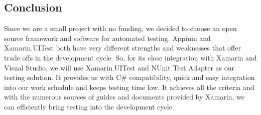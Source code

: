\documentclass[onecolumn, draftclsnofoot,10pt, compsoc]{IEEEtran}
\begin{document}
\begin{singlespace}
\subsection{Conclusion}
Since we are a small project with no funding, we decided to choose an open source framework and software for automated testing. Appium and Xamarin.UITest both have very different strengths and weaknesses that offer
trade offs in the development cycle. So, for its close integration with Xamarin and Visual Studio, we will use Xamarin.UITest and NUnit Test Adapter as our testing solution. It provides us with C\# compatibility, 
quick and easy integration into our work schedule and keeps testing time low. It achieves all the criteria and with the numerous  sources of  guides and documents provided by Xamarin, we can efficiently bring testing
into the development cycle.

\end{singlespace}
\end{document}
